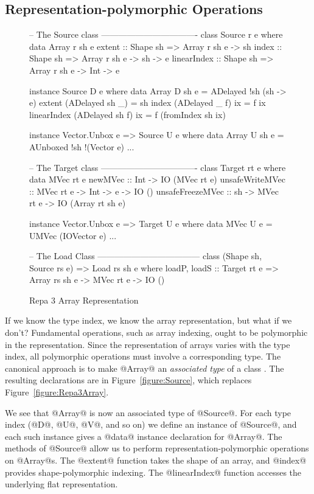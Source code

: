 \subsection{Representation-polymorphic Operations}
\label{section:Source}
\begin{figure}
\begin{small}
\begin{code}
-- The Source class ----------------------------------
class Source r e where
 data Array r sh e
 extent       :: Shape sh => Array r sh e -> sh
 index        :: Shape sh => Array r sh e -> sh  -> e
 linearIndex  :: Shape sh => Array r sh e -> Int -> e

instance Source D e where
 data Array D sh e = ADelayed !sh (sh -> e)
 extent       (ADelayed sh _)    = sh
 index        (ADelayed _  f) ix = f ix
 linearIndex  (ADelayed sh f) ix = f (fromIndex sh ix)

instance Vector.Unbox e => Source U e where 
 data Array U sh e = AUnboxed !sh !(Vector e)
 ...

-- The Target class ----------------------------------
class Target rt e where
 data MVec rt e
 newMVec          :: Int -> IO (MVec rt e)
 unsafeWriteMVec  :: MVec rt e -> Int -> e -> IO ()
 unsafeFreezeMVec :: sh  -> MVec rt e 
                         -> IO (Array rt sh e)

instance Vector.Unbox e => Target U e where
 data MVec U e = UMVec (IOVector e)
 ...

-- The Load Class ------------------------------------
class (Shape sh, Source rs e) => Load rs sh e where
 loadP, loadS :: Target rt e
              => Array rs sh e -> MVec rt e -> IO ()
\end{code}
\end{small}
\caption{Repa 3 Array Representation}
\label{figure:Source}
\label{figure:Target}
\end{figure}
If we know the type index, we know the array representation, but what if we don't? Fundamental operations, such as array indexing, ought to be polymorphic in the representation. Since the representation of arrays varies with the type index, all polymorphic operations must involve a corresponding type. The canonical approach is to make @Array@ an \emph{associated type} of a class \cite{Chakravarty:AssocTypes}. The resulting declarations are in Figure~\ref{figure:Source}, which replaces Figure~\ref{figure:Repa3Array}.

We see that @Array@ is now an associated type of @Source@.  For each type index (@D@, @U@, @V@, and so on) we define an instance of @Source@, and each such instance gives a @data@ instance declaration for @Array@. The methods of @Source@ allow us to perform representation-polymorphic operations on @Array@s. The @extent@ function takes the shape of an array, and @index@ provides shape-polymorphic indexing. The @linearIndex@ function accesses the underlying flat representation.


